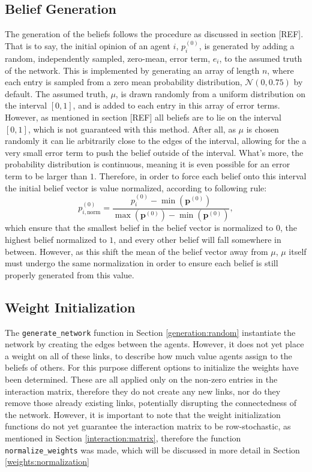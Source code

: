 \documentclass[a4paper, 12pt]{report}
\newcommand{\beli}[3][2]{p_{#2}^{(#3)}}
\begin{document}
\newpage
\subsection{Belief Generation}

The generation of the beliefs follows the procedure as discussed in section [REF]. That is to say, the initial opinion of an agent $i$, $\beli{i}{0}$, is generated by adding a random, independently sampled, zero-mean, error term, $e_i$, to the assumed truth of the network. This is implemented by generating an array of length $n$, where each entry is sampled from a zero mean probability distribution, $\mathcal{N}(0, 0.75)$ by default. The assumed truth, $\mu$, is drawn randomly from a uniform distribution on the interval $[0, 1]$, and is added to each entry in this array of error terms. \newline
However, as mentioned in section [REF] all beliefs are to lie on the interval $[0, 1]$, which is not guaranteed with this method. After all, as $\mu$ is chosen randomly it can lie arbitrarily close to the edges of the interval, allowing for the a very small error term to push the belief outside of the interval. What's more, the probability distribution is continuous, meaning it is even possible for an error term to be larger than $1$.  Therefore, in order to force each belief onto this interval the initial belief vector is value normalized, according to following rule:
\begin{equation*}
    \beli{i, \text{norm}}{0} = \frac{\beli{i}{0} - \min(\bm{p}^{(0)})}{\max(\bm{p}^{(0)}) - \min(\bm{p}^{(0)})},
\end{equation*}
which ensure that the smallest belief in the belief vector is normalized to $0$, the highest belief normalized to $1$, and every other belief will fall somewhere in between. However, as this shift the mean of the belief vector away from $\mu$, $\mu$ itself must undergo the same normalization in order to ensure each belief is still properly generated from this value.
\newline

\subsection{Weight Initialization}
The \texttt{generate\_network} function in Section \ref{generation:random} instantiate the network by creating the edges between the agents. However, it does not yet place a weight on all of these links, to describe how much value agents assign to the beliefs of others. For this purpose different options to initialize the weights have been determined. These are all applied only on the non-zero entries in the interaction matrix, therefore they do not create any new links, nor do they remove those already existing links, potentially disrupting the connectedness of the network. However, it is important to note that the weight initialization functions do not yet guarantee the interaction matrix to be row-stochastic, as mentioned in Section \ref{interaction:matrix}, therefore the function \texttt{normalize\_weights} was made, which will be discussed in more detail in Section \ref{weights:normalization}
\end{document}
